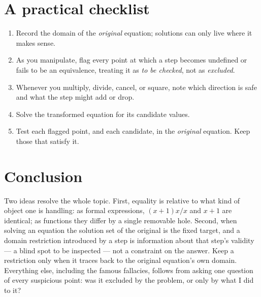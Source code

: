 \documentclass{essay}
\begin{document}
\section{A practical checklist}

\begin{enumerate}
  \item Record the domain of the \emph{original} equation; solutions can only live where it
    makes sense.
  \item As you manipulate, flag every point at which a step becomes undefined or fails to be
    an equivalence, treating it as \emph{to be checked}, not as \emph{excluded}.
  \item Whenever you multiply, divide, cancel, or square, note which direction is safe and
    what the step might add or drop.
  \item Solve the transformed equation for its candidate values.
  \item Test each flagged point, and each candidate, in the \emph{original} equation. Keep
    those that satisfy it.
\end{enumerate}

\section{Conclusion}

Two ideas resolve the whole topic. First, equality is relative to what kind of object one
is handling: as formal expressions, \((x+1)x/x\) and \(x+1\) are identical; as functions they
differ by a single removable hole. Second, when solving an equation the solution set of the
original is the fixed target, and a domain restriction introduced by a step is information
about that step's validity --- a blind spot to be inspected --- not a constraint on the
answer. Keep a restriction only when it traces back to the original equation's own domain.
Everything else, including the famous fallacies, follows from asking one question of every
suspicious point: was it excluded by the problem, or only by what I did to it?
\end{document}
